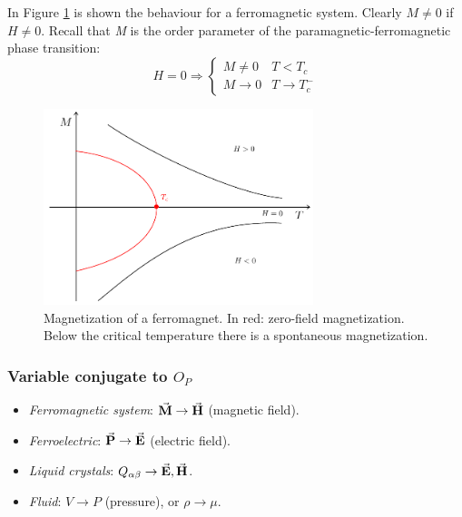 \documentclass[../main/main.tex]{subfiles}
\begin{document}
In Figure \ref{fig:3_3} is shown the behaviour for a ferromagnetic system. Clearly \( M \neq 0 \) if \( H \neq 0 \). Recall that \emph{M} is the order parameter of the paramagnetic-ferromagnetic phase transition:
\begin{equation*}
  H= 0 \Rightarrow \begin{cases}
    M \neq 0 & T < T_c   \\
    M \rightarrow 0 & T \rightarrow T_c^-
\end{cases}
\end{equation*}

\begin{figure}[h!]
\centering
\includegraphics[width=0.7\textwidth]{../lessons/3_image/5.pdf}
\caption{\label{fig:3_3} Magnetization of a ferromagnet. In red: zero-field magnetization. Below the critical temperature there is a spontaneous magnetization.}
\end{figure}

\subsubsection{Variable conjugate to \( O_P \)}
\begin{itemize}
\item \emph{Ferromagnetic system}: \( \va{M} \rightarrow \va{H}   \) (magnetic field).
\item \emph{Ferroelectric}: \( \va{P} \rightarrow \va{E}   \)  (electric field).
\item \emph{Liquid crystals}: \( Q_{\alpha \beta } \rightarrow \va{E},\va{H}   \).
\item \emph{Fluid}: \( V \rightarrow P \) (pressure), or \( \rho \rightarrow \mu  \).
\end{itemize}
\end{document}
